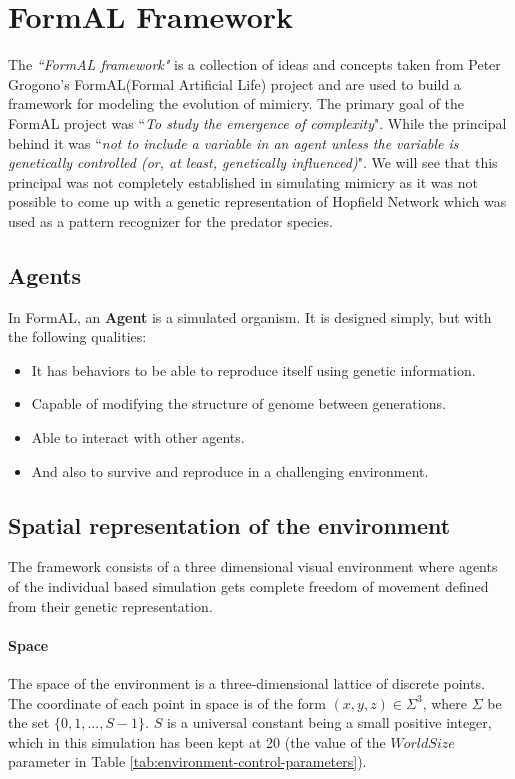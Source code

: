 \section{FormAL Framework}
The \textsl{``FormAL framework"} is a collection of ideas and concepts taken from Peter Grogono's FormAL(Formal Artificial Life) project \cite{grogono2003} and are used to build a framework for modeling the evolution of mimicry. The primary goal of the FormAL project was ``\textit{To study the emergence of complexity}". While the principal behind it was ``\textit{not to include a variable in an agent unless the variable is genetically controlled (or, at least, genetically influenced)}". We will see that this principal was not completely established in simulating mimicry as it was not possible to come up with a genetic representation of Hopfield Network which was used as a pattern recognizer for the predator species. 

\subsection{Agents}
In FormAL, an \textbf{Agent} is a simulated organism. It is designed simply, but with the following qualities:

\begin{itemize}
	\item It has behaviors to be able to reproduce itself using genetic information.
	\item Capable of modifying the structure of genome between generations.
	\item Able to interact with other agents.
	\item And also to survive and reproduce in a challenging environment.
\end{itemize}

\subsection{Spatial representation of the environment}
The framework consists of a three dimensional visual environment where agents of the individual based simulation gets complete freedom of movement defined from their genetic representation. 

\paragraph{Space}
The space of the environment is a three-dimensional lattice of discrete points. The coordinate of each point in space is of the form \((x,y,z) \in \Sigma^3\), where \(\Sigma\) be the set \(\{0, 1, ..., S-1\}\). \(S\) is a universal constant being a small positive integer, which in this simulation has been kept at 20 (the value of the \(World Size\) parameter in Table \ref{tab:environment-control-parameters}). 

